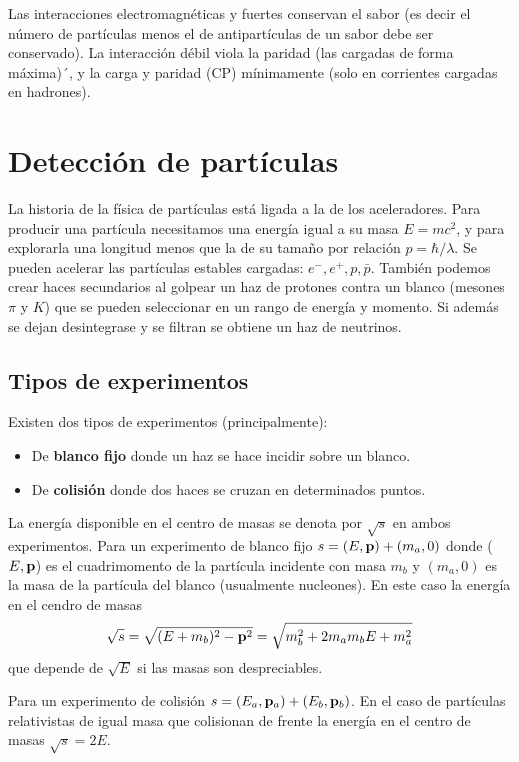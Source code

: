 Las interacciones electromagnéticas y fuertes conservan el sabor (es decir el número de partículas menos el de antipartículas de un sabor debe ser conservado). La interacción débil viola la paridad (las cargadas de forma máxima)´, y la carga y paridad (CP) mínimamente (solo en corrientes cargadas en hadrones).


\section{Detección de partículas}

La historia de la física de partículas está ligada a la de los aceleradores. Para producir una partícula necesitamos una energía igual a su masa $E=mc^2$, y para explorarla una longitud menos que la de su tamaño por relación $p=\hbar/\lambda$. Se pueden acelerar las partículas estables cargadas: $e^-,e^+,p,\bar{p}$. También podemos crear haces secundarios al golpear un haz de protones contra un blanco (mesones $\pi$ y $K$) que se pueden seleccionar en un rango de energía y momento. Si además se dejan desintegrase y se filtran se obtiene un haz de neutrinos.

\subsection{Tipos de experimentos}

Existen dos tipos de experimentos (principalmente):

\begin{itemize}
	\item De \textbf{blanco fijo} donde un haz se hace incidir sobre un blanco.
	\item De \textbf{colisión} donde dos haces se cruzan en determinados puntos. 
\end{itemize}
La energía disponible en el centro de masas se denota por $\sqrt{s}$ en ambos experimentos. Para un experimento de blanco fijo $s=(E,\mathbf{p})+(m_a,0)$ donde ($E,\mathbf{p}$) es el cuadrimomento de la partícula incidente con masa $m_b$ y $(m_a,0)$ es la masa de la partícula del blanco (usualmente nucleones). En este caso la energía en el cendro de masas 
\begin{equation}
	\sqrt{s} = \sqrt{(E+m_b)^2 - \mathbf{p}^2 } = \sqrt{m_b^2 + 2 m_a m_bE + m_a^2}
\end{equation}
que depende de $\sqrt{E}$ si las masas son despreciables. 

Para un experimento de colisión $s=(E_a,\mathbf{p}_a)+(E_b,\mathbf{p}_b)$. En el caso de partículas relativistas de igual masa que colisionan de frente la energía en el centro de masas $\sqrt{s}= 2 E$.


